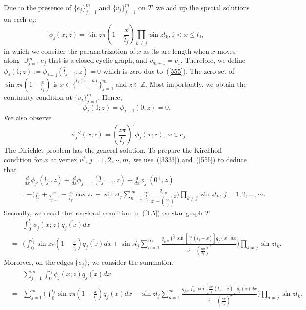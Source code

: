 \documentclass[10pt,a4paper]{article}
\theoremstyle{plain}
\theoremstyle{definition}
\theoremstyle{remark}
\numberwithin{equation}{section}
\begin{document}
\par
Due to the presence of $\{\bar{e}_{j}\}_{j=1}^{m}$ and $\{v_{j}\}_{j=1}^{m}$ on $\overline{T}$, we add up the special solutions on each $\bar{e}_{j}$:
\begin{equation}
\phi_{j}(x;z)=\sin{z\pi}(1-\frac{x}{\bar{l}_{j}})\prod_{k\neq j}\sin{z l_{k}},   0<x\leq\bar{l}_{j},\label{555}
\end{equation}
in which we consider the parametrization of $x$ as its are length when $x$ moves along $\cup_{j=1}^{m}\bar{e}_{j}$ that is a closed cyclic graph, and $v_{m+1}=v_{1}$. Therefore, we define $\phi_{j}(0;z):=\phi_{j-1}(\bar{l}_{j-1};z)=0$ which is zero due to~(\ref{555}).
The zero set of $\sin{z\pi}(1-\frac{x}{\bar{l}_{j}})$ is $x\in\{\frac{\bar{l}_{j}(z-n)}{z}\}_{j=1}^{m}$ and $z\in\mathbb{Z}$. Most importantly, we obtain the continuity condition at $\{v_{j}\}_{j=1}^{m}$.
Hence,
\begin{equation}
\phi_{j}(0;z)=\phi_{j+1}(0;z)=0.
\end{equation}
We also observe $$-\phi_{j}''(x;z)=(\frac{z\pi}{\bar{l}_{j}})^{2}\phi_{j}(x;z),\,x\in \bar{e}_{j}.$$ The Dirichlet problem has the general solution. To prepare the Kirchhoff condition for $x$ at vertex $v^{j}$, $j=1,2,\cdots,m,$
we use~(\ref{3333}) and~(\ref{555}) to deduce that
\begin{eqnarray}\nonumber
&&\hspace{12pt}\frac{d}{dx}\phi_{j'}(l_{j'}^{-},z)+\frac{d}{dx}\phi_{j'-1}(\bar{l}_{j'-1}^{-},z)+\frac{d}{dx}\phi_{j'}(0^{+},z)\\
&&\nonumber=-\Big(\frac{z\pi}{l_{j'}}+\frac{z\pi}{\bar{l}_{j'-1}}+\frac{z\pi}{\bar{l}_{j'}}\cos{z\pi}+\sin{zl_{j}}\sum_{n=1}^{\infty}\frac{n\pi}{l_{j}}\frac{q_{j,n}}{z^{2}-(\frac{n\pi}{l_{j}})^{2}}\Big)\prod_{k\neq j}\sin{z l_{k}},\,j=1,2,\ldots,m.\label{288}%
\end{eqnarray}
Secondly, we recall the non-local condition in~(\ref{1.5}) on star graph $T$,
\begin{eqnarray}\nonumber
&&\int_{0}^{l_{j}}\phi_{j}(x;z)\overline{q_{j}(x)}dx\\&=&\Big(\int_{0}^{l_{j}}\sin{z\pi(1-\frac{x}{l_{j}})}\overline{q_{j}(x)}dx+\sin{z l_{j}}\sum_{n=1}^{\infty}\frac{q_{j,n}\int_{0}^{l_{j}}\sin[\frac{n\pi}{l_{j}}(l_{j}-x)]\overline{q_{j}(x)}dx}{z^{2}-(\frac{n\pi}{l_{j}})^{2}}\Big)\prod_{k\neq j}\sin{z l_{k}}.
\end{eqnarray}
Moreover, on the edges $\{e_{j}\}$, we consider the summation
\begin{eqnarray}\nonumber
&&\sum_{j=1}^{m}\int_{0}^{l_{j}}\phi_{j}(x;z)\overline{q_{j}(x)}dx\\&=&\sum_{j=1}^{m}\Big(\int_{0}^{l_{j}}\sin{z\pi(1-\frac{x}{l_{j}})}\overline{q_{j}(x)}dx+\sin{z l_{j}}\sum_{n=1}^{\infty}\frac{q_{j,n}\int_{0}^{l_{j}}\sin[\frac{n\pi}{l_{j}}(l_{j}-x)]\overline{q_{j}(x)}dx}{z^{2}-(\frac{n\pi}{l_{j}})^{2}}\Big)\prod_{n\neq j}\sin{z l_{k}}.\label{29}
\end{eqnarray}
\end{document}
